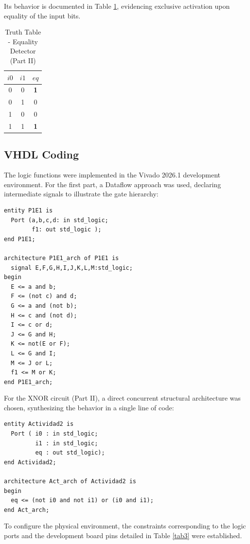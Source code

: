 \documentclass[conference]{IEEEtran}
\begin{document}
Its behavior is documented in Table \ref{tab2}, evidencing exclusive activation upon equality of the input bits.

\begin{table}[htbp]
\caption{Truth Table - Equality Detector (Part II)}
\begin{center}
\begin{tabular}{ccc}
\toprule
$i0$ & $i1$ & $eq$ \\
\midrule
0 & 0 & \textbf{1} \\
0 & 1 & 0 \\
1 & 0 & 0 \\
1 & 1 & \textbf{1} \\
\bottomrule
\end{tabular}
\label{tab2}
\end{center}
\end{table}

\subsection{VHDL Coding}
The logic functions were implemented in the Vivado 2026.1 development environment. For the first part, a Dataflow approach was used, declaring intermediate signals to illustrate the gate hierarchy:

{\footnotesize
\begin{verbatim}
entity P1E1 is
  Port (a,b,c,d: in std_logic;
        f1: out std_logic );
end P1E1;

architecture P1E1_arch of P1E1 is
  signal E,F,G,H,I,J,K,L,M:std_logic;
begin
  E <= a and b;
  F <= (not c) and d;
  G <= a and (not b);
  H <= c and (not d);
  I <= c or d;
  J <= G and H;
  K <= not(E or F);
  L <= G and I;
  M <= J or L;
  f1 <= M or K; 
end P1E1_arch;
\end{verbatim}
}

For the XNOR circuit (Part II), a direct concurrent structural architecture was chosen, synthesizing the behavior in a single line of code:

{\footnotesize
\begin{verbatim}
entity Actividad2 is
  Port ( i0 : in std_logic;
         i1 : in std_logic;
         eq : out std_logic);
end Actividad2;

architecture Act_arch of Actividad2 is
begin
  eq <= (not i0 and not i1) or (i0 and i1);
end Act_arch;
\end{verbatim}
}

To configure the physical environment, the constraints corresponding to the logic ports and the development board pins detailed in Table \ref{tab3} were established.
\end{document}

